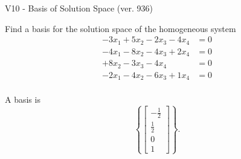 \begin{exercise}
  \begin{exerciseTitle}V10 - Basis of Solution Space (ver. 936)\end{exerciseTitle}
  \begin{exerciseStatement}
    Find a basis for the solution space of the homogeneous system 
\begin{align*}
 -3 x_ 1 + 5 x_ 2 -2 x_ 3 -4 x_ 4 &= 0  \\ 
  -4 x_ 1 -8 x_ 2 -4 x_ 3 + 2 x_ 4 &= 0  \\ 
  + 8 x_ 2 -3 x_ 3 -4 x_ 4 &= 0  \\ 
  -2 x_ 1 -4 x_ 2 -6 x_ 3 + 1 x_ 4 &= 0  \\ 
 \end{align*}


 
  \end{exerciseStatement}

  \begin{exerciseAnswer}
   A basis is   
\[\left\{\left[\begin{array}{c}
-\frac{1}{2} \\
\frac{1}{2} \\
0 \\
1
\end{array}\right]\right\}.\]

  


  \end{exerciseAnswer}
\end{exercise}